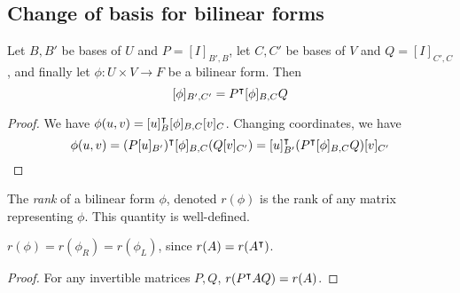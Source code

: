 \subsection{Change of basis for bilinear forms}
\begin{proposition}
	Let $B, B'$ be bases of $U$ and $P = [I]_{B', B}$, let $C, C'$ be bases of $V$ and $Q = [I]_{C', C}$, and finally let $\phi \colon U \times V \to F$ be a bilinear form.
	Then
	\[
		[\phi]_{B', C'} = P^\intercal [\phi]_{B,C} Q
	\]
\end{proposition}
\begin{proof}
	We have $\phi(u,v) = [u]_B^\intercal [\phi]_{B,C} [v]_C$.
	Changing coordinates, we have
	\[
		\phi(u,v) = (P [u]_{B'})^\intercal [\phi]_{B,C} (Q [v]_{C'}) = [u]_{B'}^\intercal (P^\intercal [\phi]_{B,C} Q) [v]_{C'}
	\]
\end{proof}
\begin{lemma}
	The \textit{rank} of a bilinear form $\phi$, denoted $r(\phi)$ is the rank of any matrix representing $\phi$.
	This quantity is well-defined.
\end{lemma}
\begin{remark}
	$r(\phi) = r(\phi_R) = r(\phi_L)$, since $r(A) = r(A^\intercal)$.
\end{remark}
\begin{proof}
	For any invertible matrices $P, Q$, $r(P^\intercal A Q) = r(A)$.
\end{proof}
